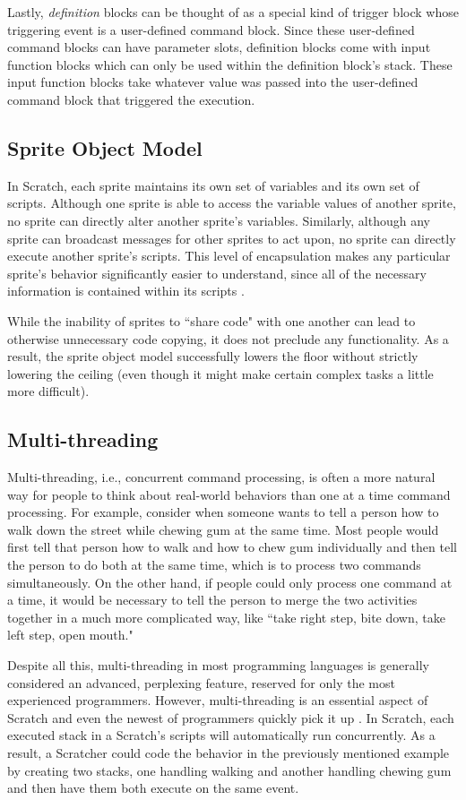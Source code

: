 Lastly, \emph{definition} blocks can be thought of as a special kind of trigger block whose triggering event is a user-defined command block. Since these user-defined command blocks can have parameter slots, definition blocks come with input function blocks which can only be used within the definition block's stack. These input function blocks take whatever value was passed into the user-defined command block that triggered the execution.

\subsection{Sprite Object Model}
In Scratch, each sprite maintains its own set of variables and its own set of scripts. Although one sprite is able to access the variable values of another sprite, no sprite can directly alter another sprite's variables. Similarly, although any sprite can broadcast messages for other sprites to act upon, no sprite can directly execute another sprite's scripts. This level of encapsulation makes any particular sprite's behavior significantly easier to understand, since all of the necessary information is contained within its scripts \cite{Maloney}.

While the inability of sprites to ``share code" with one another can lead to otherwise unnecessary code copying, it does not preclude any functionality. As a result, the sprite object model successfully lowers the floor without strictly lowering the ceiling (even though it might make certain complex tasks a little more difficult).

\subsection{Multi-threading}
Multi-threading, i.e., concurrent command processing, is often a more natural way for people to think about real-world behaviors than one at a time command processing. For example, consider when someone wants to tell a person how to walk down the street while chewing gum at the same time. Most people would first tell that person how to walk and how to chew gum individually and then tell the person to do both at the same time, which is to process two commands simultaneously. On the other hand, if people could only process one command at a time, it would be necessary to tell the person to merge the two activities together in a much more complicated way, like ``take right step, bite down, take left step, open mouth."

Despite all this, multi-threading in most programming languages is generally considered an advanced, perplexing feature, reserved for only the most experienced programmers. However, multi-threading is an essential aspect of Scratch and even the newest of programmers quickly pick it up \cite{Maloney}. In Scratch, each executed stack in a Scratch's scripts will automatically run concurrently. As a result, a Scratcher could code the behavior in the previously mentioned example by creating two stacks, one handling walking and another handling chewing gum and then have them both execute on the same event.

